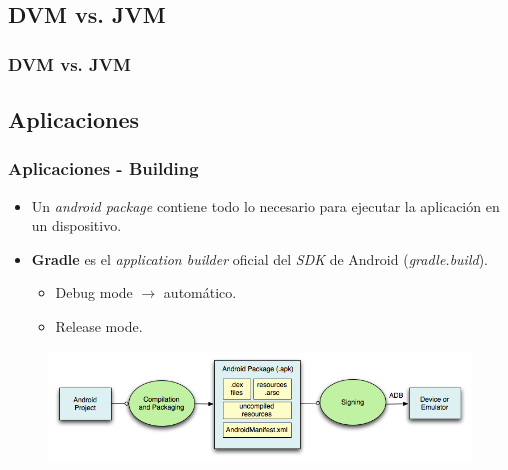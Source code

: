 \subsection{DVM vs. JVM}
\begin{frame}
  \frametitle{DVM vs. JVM}  
  \begin{table}
      \centering
  \end{table}
\end{frame}

\subsection{Aplicaciones}
\begin{frame}
  \frametitle{Aplicaciones - Building}
  \begin{itemize}
    \item Un \textit{android package} contiene todo lo necesario para ejecutar la aplicación en un dispositivo.
    
    \item \textbf{Gradle} es el \textit{application builder} oficial del \textit{SDK} de Android (\textit{gradle.build}).
    \begin{itemize}
	\item Debug mode $\rightarrow$ automático.
	\item Release mode.
    \end{itemize}
  \end{itemize}
  
  \begin{figure}
    \centering
    \includegraphics[scale=0.4]{images/build-app.png}
  \end{figure} 
\end{frame}

